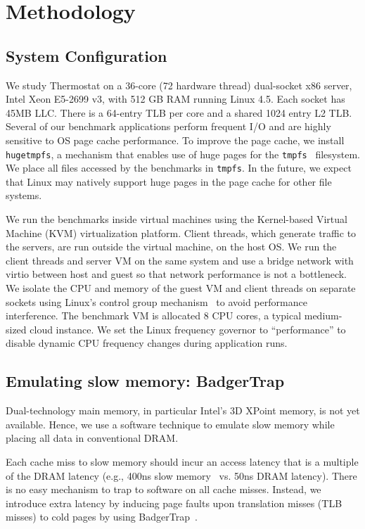\section{Methodology}
\label{section:methodology}

\subsection{System Configuration}
We study Thermostat on  a 36-core (72 hardware thread) dual-socket
x86 server, Intel Xeon E5-2699 v3, with 512 GB RAM running Linux 4.5.
Each socket has 45MB LLC. There is a 64-entry TLB per core and a shared 1024
entry L2 TLB. Several of our benchmark applications perform frequent I/O and are
highly sensitive to OS page cache performance.
To improve the page cache, we install {\tt hugetmpfs}, a mechanism that
enables use of huge pages for the {\tt tmpfs}~\cite{hughd-hugetmpfs} filesystem. 
We place all files accessed by the benchmarks in {\tt tmpfs}. In the future, we expect
that Linux may natively support huge pages in the page cache for other file
systems.

We run the benchmarks inside virtual machines using the Kernel-based Virtual
Machine (KVM) virtualization platform.  Client threads, which generate traffic to the
servers, are run outside the virtual machine, on the host OS. We run the client threads 
and server VM on the same system and use a bridge network with virtio between host 
and guest so that network performance is not a bottleneck.
We isolate the CPU and
memory of the guest VM and client threads on separate sockets using 
Linux's control group mechanism~\cite{cgroups} to avoid performance interference.  
The benchmark VM is allocated 8 CPU cores, a typical medium-sized cloud 
instance.
We set the Linux frequency governor to ``performance'' to
disable dynamic CPU frequency changes during application runs. 

\subsection{Emulating slow memory: BadgerTrap}
\label{slow-memory}
Dual-technology main memory, in particular Intel's 3D XPoint memory, 
is not yet available.  
Hence, we use a software technique to emulate slow memory while placing all
data in conventional DRAM.

Each cache miss to slow memory should incur an access latency that is a multiple 
of the DRAM latency (e.g., 400ns slow memory~\cite{ref:Dulloor:datatiering} vs. 
50ns DRAM latency).
There is no easy mechanism to trap to software on all cache misses. Instead,
we introduce extra latency by inducing page faults upon translation misses (TLB misses) 
to cold pages by using BadgerTrap~\cite{ref:badgertrap}. 

